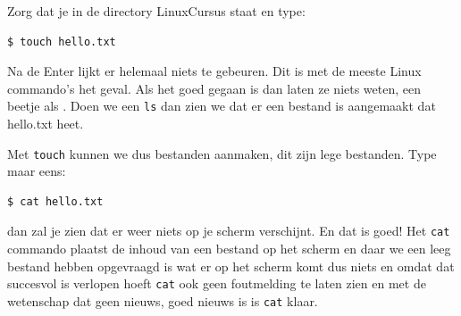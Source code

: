 Zorg dat je in de directory LinuxCursus staat en type:

\begin{lstlisting}[language=bash]
$ touch hello.txt
\end{lstlisting}

Na de Enter lijkt er helemaal niets te gebeuren. Dit is met de meeste Linux commando's het geval. Als het goed gegaan is dan laten ze niets weten, een beetje als . Doen we een \texttt{ls} dan zien we dat er een bestand is aangemaakt dat hello.txt heet.

Met \texttt{touch} kunnen we dus bestanden aanmaken, dit zijn lege bestanden. Type maar eens:

\begin{lstlisting}[language=bash]
$ cat hello.txt
\end{lstlisting}

dan zal je zien dat er weer niets op je scherm verschijnt. En dat is goed! Het \texttt{cat} commando plaatst de inhoud van een bestand op het scherm en daar we een leeg bestand hebben opgevraagd is wat er op het scherm komt dus niets en omdat dat succesvol is verlopen hoeft \texttt{cat} ook geen foutmelding te laten zien en met de wetenschap dat geen nieuws, goed nieuws is is \texttt{cat} klaar.

